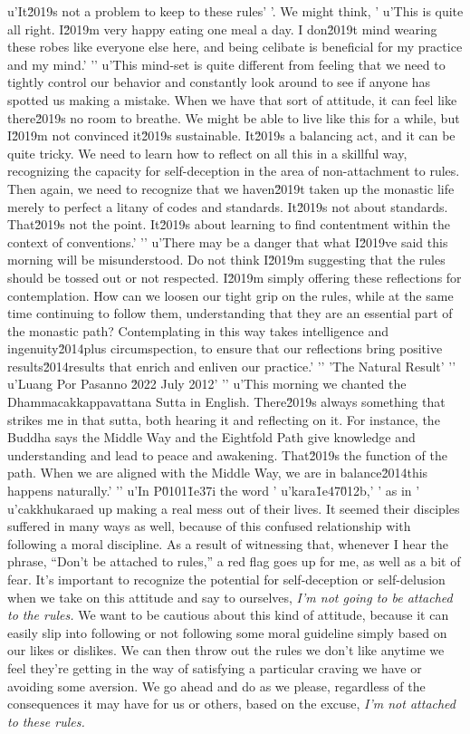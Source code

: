 u'It\u2019s not a problem to keep to these rules'
'. We might think, '
u'This is quite all right. I\u2019m very happy eating one meal a day. I don\u2019t mind wearing these robes like everyone else here, and being celibate is beneficial for my practice and my mind.'
'\n'
u'This mind-set is quite different from feeling that we need to tightly control our behavior and constantly look around to see if anyone has spotted us making a mistake. When we have that sort of attitude, it can feel like there\u2019s no room to breathe. We might be able to live like this for a while, but I\u2019m not convinced it\u2019s sustainable. It\u2019s a balancing act, and it can be quite tricky. We need to learn how to reflect on all this in a skillful way, recognizing the capacity for self-deception in the area of non-attachment to rules. Then again, we need to recognize that we haven\u2019t taken up the monastic life merely to perfect a litany of codes and standards. It\u2019s not about standards. That\u2019s not the point. It\u2019s about learning to find contentment within the context of conventions.'
'\n'
u'There may be a danger that what I\u2019ve said this morning will be misunderstood. Do not think I\u2019m suggesting that the rules should be tossed out or not respected. I\u2019m simply offering these reflections for contemplation. How can we loosen our tight grip on the rules, while at the same time continuing to follow them, understanding that they are an essential part of the monastic path? Contemplating in this way takes intelligence and ingenuity\u2014plus circumspection, to ensure that our reflections bring positive results\u2014results that enrich and enliven our practice.'
'\n'
'The Natural Result'
'\n'
u'Luang Por Pasanno \u2022 July 2012'
'\n'
u'This morning we chanted the Dhammacakkappavattana Sutta in English. There\u2019s always something that strikes me in that sutta, both hearing it and reflecting on it. For instance, the Buddha says the Middle Way and the Eightfold Path give knowledge and understanding and lead to peace and awakening. That\u2019s the function of the path. When we are aligned with the Middle Way, we are in balance\u2014this happens naturally.'
'\n'
u'In P\u0101\u1e37i the word '
u'kara\u1e47\u012b,'
' as in '
u'cakkhukaraed up making a real mess out of 
their lives. It seemed their disciples suffered in many ways as well, 
because of this confused relationship with following a moral 
discipline. As a result of witnessing that, whenever I hear the phrase, 
``Don't be attached to rules,'' a red flag goes up for me, as well as a 
bit of fear. It's important to recognize the potential for 
self-deception or self-delusion when we take on this attitude and say 
to ourselves, \emph{I'm not going to be attached to the rules.} We want 
to be cautious about this kind of attitude, because it can easily slip 
into following or not following some moral guideline simply based on 
our likes or dislikes. We can then throw out the rules we don't like 
anytime we feel they're getting in the way of satisfying a particular 
craving we have or avoiding some aversion. We go ahead and do as we 
please, regardless of the consequences it may have for us or others, 
based on the excuse, \emph{I'm not attached to these rules.}

